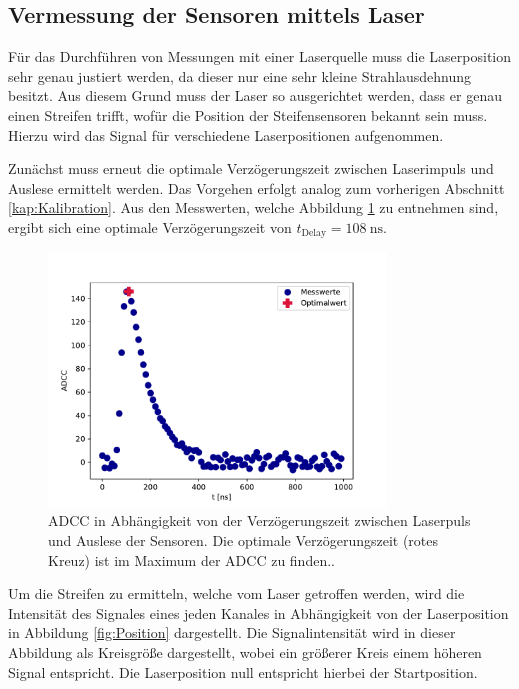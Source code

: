 \subsection{Vermessung der Sensoren mittels Laser}
\label{kap:Vermessung}
Für das Durchführen von Messungen mit einer Laserquelle muss die Laserposition sehr genau justiert werden, da dieser nur eine sehr kleine Strahlausdehnung besitzt. Aus diesem Grund muss der Laser so ausgerichtet werden, dass er genau einen Streifen trifft, wofür die Position der Steifensensoren bekannt sein muss. Hierzu wird das Signal für verschiedene Laserpositionen aufgenommen.

Zunächst muss erneut die optimale Verzögerungszeit zwischen Laserimpuls und Auslese ermittelt werden. Das Vorgehen erfolgt analog zum vorherigen Abschnitt \ref{kap:Kalibration}. Aus den Messwerten, welche Abbildung \ref{fig:Delay Laser} zu entnehmen sind, ergibt sich eine optimale Verzögerungszeit von $t_\mathrm{Delay}=\SI{108}{\nano\second}$.
\begin{figure}
  \centering
  \includegraphics[width=0.8\textwidth]{plots/Delay_Laser.pdf}
  \caption{ADCC in Abhängigkeit von der Verzögerungszeit zwischen Laserpuls und Auslese der Sensoren. Die optimale Verzögerungszeit (rotes Kreuz) ist im Maximum der ADCC zu finden..}
  \label{fig:Delay Laser}
\end{figure}
\FloatBarrier
Um die Streifen zu ermitteln, welche vom Laser getroffen werden, wird die Intensität des Signales eines jeden Kanales in Abhängigkeit von der Laserposition in Abbildung \ref{fig:Position} dargestellt. Die Signalintensität wird in dieser Abbildung als Kreisgröße dargestellt, wobei ein größerer Kreis einem höheren Signal entspricht. Die Laserposition null entspricht hierbei der Startposition.
